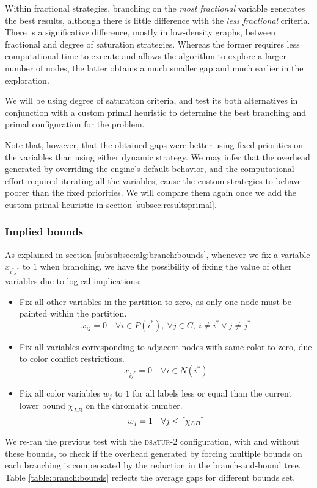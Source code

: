 Within fractional strategies, branching on the \textit{most fractional} variable generates the best results, although there is little difference with the \textit{less fractional} criteria. There is a significative difference, mostly in low-density graphs, between fractional and degree of saturation strategies. Whereas the former requires less computational time to execute and allows the algorithm to explore a larger number of nodes, the latter obtains a much smaller gap and much earlier in the exploration.

We will be using degree of saturation criteria, and test its both alternatives in conjunction with a custom primal heuristic to determine the best branching and primal configuration for the problem.

Note that, however, that the obtained gaps were better using fixed priorities on the variables than using either dynamic strategy. We may infer that the overhead generated by overriding the engine's default behavior, and the computational effort required iterating all the variables, cause the custom strategies to behave poorer than the fixed priorities. We will compare them again once we add the custom primal heuristic in section \ref{subsec:resultsprimal}.

\subsubsection*{Implied bounds}

As explained in section \ref{subsubsec:alg:branch:bounds}, whenever we fix a variable $x_{i^*j^*}$ to $1$ when branching, we have the possibility of fixing the value of other variables due to logical implications:
\begin{itemize}
\item Fix all other variables in the partition to zero, as only one node must be painted within the partition.
\[
x_{ij} = 0 \quad \forall i \in P(i^*),\ \forall j \in C,\ i \neq i^* \vee j \neq j^*
\]
\item Fix all variables corresponding to adjacent nodes with same color to zero, due to color conflict restrictions.
\[
x_{ij^*} = 0 \quad \forall i \in N(i^*)
\]
\item Fix all color variables $w_j$ to $1$ for all labels less or equal than the current lower bound $\chi_{LB}$ on the chromatic number.
\[
w_j = 1 \quad \forall j \leq \left\lceil \chi_{LB} \right\rceil
\] 
\end{itemize}

We re-ran the previous test with the \textsc{dsatur-2} configuration, with and without these bounds, to check if the overhead generated by forcing multiple bounds on each branching is compensated by the reduction in the branch-and-bound tree. Table \ref{table:branch:bounds} reflects the average gaps for different bounds set.

